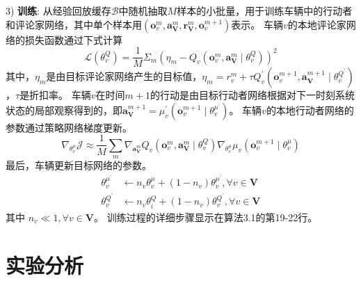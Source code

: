 3) \textbf{训练}: 从经验回放缓存$\mathcal{B}$中随机抽取$M$样本的小批量，用于训练车辆中的行动者和评论家网络，其中单个样本用$(\boldsymbol{o}_{v}^{m}, \boldsymbol{a}_{\mathbf{V}}^{m}, \boldsymbol{r}_{\mathbf{V}}^{m}, \boldsymbol{o}_{v}^{m+1})$表示。
车辆$v$的本地评论家网络的损失函数通过下式计算
\begin{equation}
	\mathcal{L}\left(\theta_{v}^{Q}\right)=\frac{1}{M} \Sigma_{m}\left(\eta_{m}-Q_{v}\left(\boldsymbol{o}_{v}^{m}, \boldsymbol{a}_{\mathbf{V}}^{m} \mid \theta_{v}^{Q}\right)\right)^{2}
\end{equation}
\noindent 其中，$\eta_{m}$是由目标评论家网络产生的目标值，$\eta_{m}=r_{v}^{m}+\tau Q_{v}^{\prime}(\boldsymbol{o}_{v}^{m+1}, \boldsymbol{a}_{\mathbf{V}}^{m+1} \mid \theta_{v}^{Q^{\prime}})$，$\tau$是折扣率。
车辆$v$在时间$m+1$的行动是由目标行动者网络根据对下一时刻系统状态的局部观察得到的，即$\boldsymbol{a}_{\mathbf{V}}^{m+1}=\mu_{v}^{\prime}(\boldsymbol{o}_{v}^{m+1} \mid \theta_{v}^{\mu^{\prime}})$。
车辆$v$的本地行动者网络的参数通过策略网络梯度更新。
\begin{equation}
	\nabla_{\theta_{v}^{\mu}} \mathcal{J} \approx \frac{1}{M} \sum_{m} \nabla_{\boldsymbol{a}_{\mathbf{V}}^{m}} Q_{v}\left(\boldsymbol{o}_{v}^{m}, \boldsymbol{a}_{\mathbf{V}}^{m} \mid \theta_{v}^{Q}\right) \nabla_{\theta_{v}^{\mu}} \mu_{v}\left(\boldsymbol{o}_{v}^{m+1} \mid \theta_{v}^{\mu}\right)
\end{equation}
最后，车辆更新目标网络的参数。
\begin{align}
	\theta_{v}^{\mu^{\prime}} &\leftarrow n_{v} \theta_{v}^{\mu}+(1-n_{v})  \theta_{v}^{\mu^{\prime}}, \forall v \in \mathbf{V}\\
	\theta_{v}^{Q^{\prime}} &\leftarrow n_{v} \theta_{i}^{Q}+(1-n_{v})  \theta_{v}^{Q^{\prime}}, \forall v \in \mathbf{V}
\end{align}
\noindent 其中 $n_{v} \ll 1, \forall v \in \mathbf{V} $。
训练过程的详细步骤显示在算法3.1的第19-22行。

\section{实验分析}\label{section 3-5}

